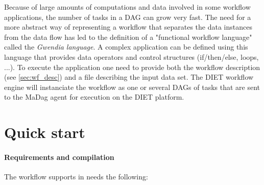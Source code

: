 Because of large amounts of computations and data involved in some workflow
applications, the number of tasks in a DAG can grow very fast. The need for a
more abstract way of representing a workflow that separates the data instances from
the data flow has led to the definition of a "functional workflow language" called the
\textit{Gwendia language}. A complex application can be defined using this language that
provides data operators and control structures (if/then/else, loops, ...). To
execute the application one need to provide both the workflow description (see
\ref{sec:wf_desc}) and a file describing the input data set. The DIET workflow
engine will instanciate the workflow as one or several DAGs of tasks that are
sent to the MaDag agent for execution on the DIET platform.

\section{Quick start}

\paragraph{Requirements and compilation}

The workflow supports in \diet needs the following:

